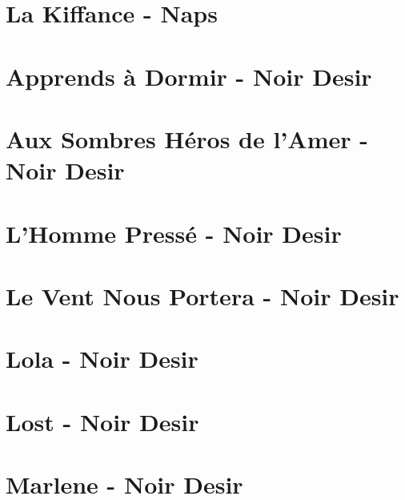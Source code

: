 \documentclass[11pt]{article}
\begin{document}
\section{La Kiffance - Naps}


\section{Apprends à Dormir - Noir Desir}
\begin{guitar}

\end{guitar}

\section{Aux Sombres Héros de l'Amer - Noir Desir}
\begin{guitar}

\end{guitar}


\section{L'Homme Pressé - Noir Desir}
\begin{guitar}

\end{guitar}

\section{Le Vent Nous Portera - Noir Desir}
\begin{guitar}

\end{guitar}


\section*{Lola - Noir Desir}
\begin{guitar}

\end{guitar}




\section{Lost - Noir Desir}


\section{Marlene - Noir Desir}
\begin{guitar}

\end{guitar}
\end{document}
